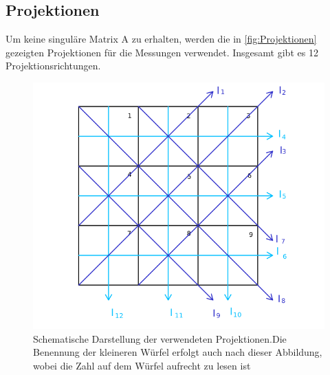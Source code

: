 \subsection{Projektionen}
Um keine singuläre Matrix A zu erhalten, werden die in \autoref{fig:Projektionen} gezeigten Projektionen für die Messungen verwendet.
Insgesamt gibt es 12 Projektionsrichtungen.

\begin{figure}[H]
    \centering
    \includegraphics[width=\textwidth]{bilder/projektionen.png}
    \caption{Schematische Darstellung der verwendeten Projektionen.Die Benennung der kleineren Würfel erfolgt auch nach dieser Abbildung, wobei die Zahl auf dem Würfel aufrecht zu lesen ist}
    \label{fig:Projektionen}
\end{figure}

